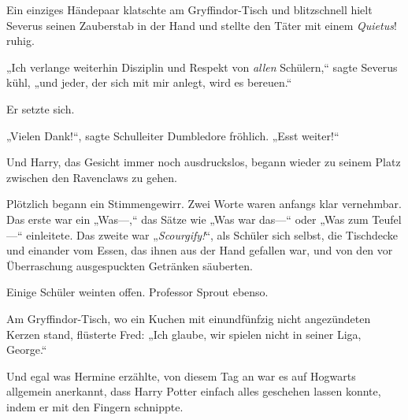 Ein einziges Händepaar klatschte am Gryffindor-Tisch und blitzschnell hielt Severus seinen Zauberstab in der Hand und stellte den Täter mit einem \emph{Quietus}! ruhig.

„Ich verlange weiterhin Disziplin und Respekt von \emph{allen} Schülern,“ sagte Severus kühl, „und jeder, der sich mit mir anlegt, wird es bereuen.“

Er setzte sich.

„Vielen Dank!“, sagte Schulleiter Dumbledore fröhlich. „Esst weiter!“

Und Harry, das Gesicht immer noch ausdruckslos, begann wieder zu seinem Platz zwischen den Ravenclaws zu gehen.

Plötzlich begann ein Stimmengewirr. Zwei Worte waren anfangs klar vernehmbar. Das erste war ein „Was—,“ das Sätze wie „Was war das—“ oder „Was zum Teufel—“ einleitete. Das zweite war „\emph{Scourgify!}“, als Schüler sich selbst, die Tischdecke und einander vom Essen, das ihnen aus der Hand gefallen war, und von den vor Überraschung ausgespuckten Getränken säuberten.

Einige Schüler weinten offen. Professor Sprout ebenso.

Am Gryffindor-Tisch, wo ein Kuchen mit einundfünfzig nicht angezündeten Kerzen stand, flüsterte Fred: „Ich glaube, wir spielen nicht in seiner Liga, George.“

Und egal was Hermine erzählte, von diesem Tag an war es auf Hogwarts allgemein anerkannt, dass Harry Potter einfach alles geschehen lassen konnte, indem er mit den Fingern schnippte.

